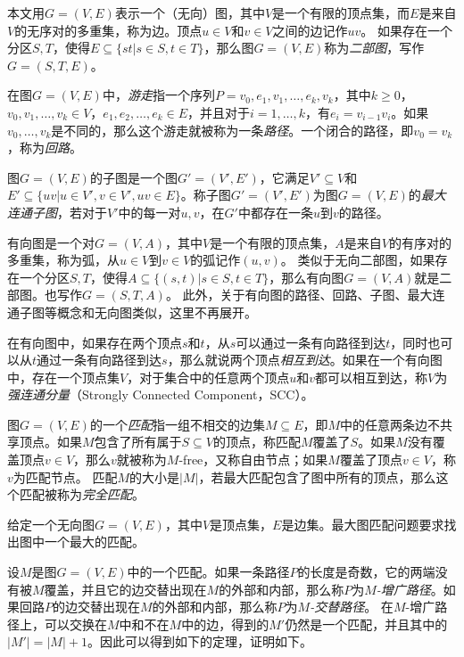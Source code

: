 本文用$G = (V, E)$表示一个（无向）图，其中$V$是一个有限的顶点集，而$E$是来自$V$的无序对的多重集，称为边。顶点$u \in V$和$v \in V$之间的边记作$uv$。
如果存在一个分区$S, T$，使得$E \subseteq \{st | s \in S, t \in T \}$，那么图$G = (V, E)$称为\textit{二部图}，写作$G = (S, T, E)$。

在图$G = (V, E)$中，\textit{游走}指一个序列$P = v_0, e_1, v_1, \dots, e_k, v_k$，其中$k \geq 0$，$v_0, v_1, \dots, v_k \in V$，$e_1, e_2, \dots, e_k \in E$，并且对于$i = 1, \dots, k$，有$e_i = v_{i-1}v_i$。如果$v_0, \dots, v_k$是不同的，那么这个游走就被称为一条\textit{路径}。一个闭合的路径，即$v_0 = v_k$，称为\textit{回路}。

图$G = (V, E)$的子图是一个图$G' = (V', E')$，它满足$V' \subseteq V$和$E' \subseteq \{uv | u \in V', v \in V', uv \in E\}$。称子图$G' = (V', E')$为图$G = (V, E)$的\textit{最大连通子图}，若对于$V'$中的每一对$u, v$，在$G'$中都存在一条$u$到$v$的路径。

有向图是一个对$G = (V, A)$，其中$V$是一个有限的顶点集，$A$是来自$V$的有序对的多重集，称为弧，从$u \in V$到$v \in V$的弧记作$(u, v)$。
类似于无向二部图，如果存在一个分区$S, T$，使得$A \subseteq \{(s, t) | s \in S, t \in T \}$，那么有向图$G = (V, A)$就是二部图。也写作$G = (S, T, A)$。
此外，关于有向图的路径、回路、子图、最大连通子图等概念和无向图类似，这里不再展开。

在有向图中，如果存在两个顶点$s$和$t$，从$s$可以通过一条有向路径到达$t$，同时也可以从$t$通过一条有向路径到达$s$，那么就说两个顶点\textit{相互到达}。如果在一个有向图中，存在一个顶点集$V$，对于集合中的任意两个顶点$u$和$v$都可以相互到达，称$V$为\textit{强连通分量}（Strongly Connected Component，SCC）。

图$G = (V, E)$的一个\textit{匹配}指一组不相交的边集$M \subseteq E$，即$M$中的任意两条边不共享顶点。如果$M$包含了所有属于$S \subseteq V$的顶点，称匹配$M$覆盖了$S$。如果$M$没有覆盖顶点$v \in V$，那么$v$就被称为$M$-free，又称自由节点；如果$M$覆盖了顶点$v \in V$，称$v$为匹配节点。
匹配$M$的大小是$|M|$，若最大匹配包含了图中所有的顶点，那么这个匹配被称为\textit{完全匹配}。

\begin{definition}
    给定一个无向图$G = (V, E)$，其中$V$是顶点集，$E$是边集。最大图匹配问题要求找出图中一个最大的匹配。
\end{definition}

设$M$是图$G = (V, E)$中的一个匹配。如果一条路径$P$的长度是奇数，它的两端没有被$M$覆盖，并且它的边交替出现在$M$的外部和内部，那么称$P$为\textit{$M$-增广路径}。如果回路$P$的边交替出现在$M$的外部和内部，那么称$P$为\textit{$M$-交替路径}。
在$M$-增广路径上，可以交换在$M$中和不在$M$中的边，得到的$M'$仍然是一个匹配，并且其中的$|M'| = |M| + 1$。因此可以得到如下的定理，证明如下。


